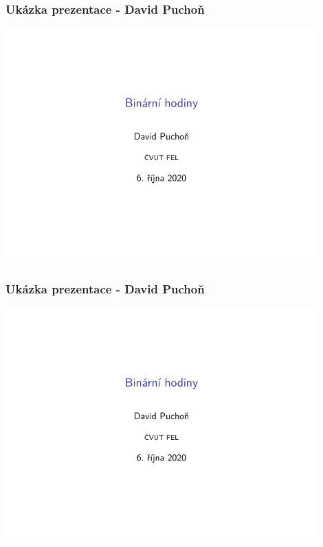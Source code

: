 \documentclass{beamer}
\begin{document}
	\begin{frame}
    \frametitle{Ukázka prezentace - David Puchoň}
		
		\includegraphics[page=2,width=0.9\textwidth]{pdf/KEO-David_Puchon-Prezentace.pdf}
	
	\end{frame}
	\begin{frame}
    \frametitle{Ukázka prezentace - David Puchoň}
		
		\includegraphics[page=3,width=0.9\textwidth]{pdf/KEO-David_Puchon-Prezentace.pdf}
	
	\end{frame}
\end{document}
